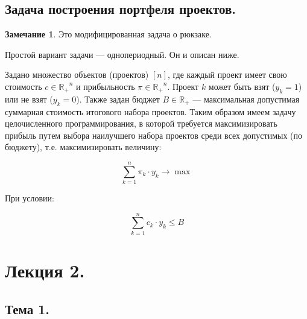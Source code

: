 \documentclass[reqno]{article}
\theoremstyle{definition}
\newtheorem*{nb}{Замечание}
\theoremstyle{definition}
\theoremstyle{definition}
\theoremstyle{definition}
\theoremstyle{definition}
\theoremstyle{definition}
\theoremstyle{definition}
\theoremstyle{definition}
\theoremstyle{definition}
\begin{document}
		\subsection{Задача построения портфеля проектов.}

			\begin{nb}
				Это модифицированная задача о рюкзаке.
			\end{nb}
			
			Простой вариант задачи --- однопериодный. Он и описан ниже.
			
			Задано множество объектов (проектов) $[n]$, где каждый проект имеет свою стоимость $c \in \mathds{R_+}^n$ и прибыльность $\pi \in \mathds{R_+}^n$. Проект $k$ может быть взят ($y_k = 1$) или не взят ($y_k = 0$). Также задан бюджет $B \in \mathds{R_+}$ --- максимальная допустимая суммарная стоимость итогового набора проектов. Таким образом имеем задачу целочисленного программирования, в которой требуется максимизировать прибыль путем выбора наилучшего набора проектов среди всех допустимых (по бюджету), т.е. максимизировать величину:
			
			$$\sum^n_{k=1} \pi_k \cdot y_k \rightarrow \max$$

			При условии:
			
			$$\sum^n_{k=1} c_k \cdot y_k \leq B$$



	\newpage
	\section{Лекция 2.}

		\subsection{Тема 1.}
\end{document}
